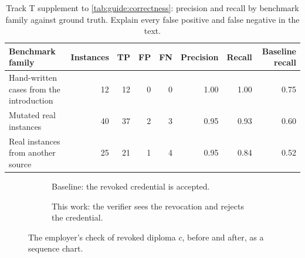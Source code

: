 \begin{table}[!ht]
  \centering
  \caption{Track T supplement to \cref{tab:guide:correctness}: precision and recall by benchmark family against ground truth. Explain every false positive and false negative in the text.}
  \label{tab:guide:precision}
  {\small
  \begin{tabularx}{\linewidth}{>{\raggedright\arraybackslash}X r r r r r r r}
    \toprule
    \textbf{Benchmark family} & \textbf{Instances} & \textbf{TP} & \textbf{FP} & \textbf{FN} & \textbf{Precision} & \textbf{Recall} & \textbf{Baseline recall} \\
    \midrule
    Hand-written cases from the introduction & 12 & 12 & 0 & 0 & 1.00 & 1.00 & 0.75 \\
    Mutated real instances & 40 & 37 & 2 & 3 & 0.95 & 0.93 & 0.60 \\
    Real instances from another source & 25 & 21 & 1 & 4 & 0.95 & 0.84 & 0.52 \\
    \bottomrule
  \end{tabularx}
  }
\end{table}

\begin{figure}[!ht]
  \centering
  \newcommand{\lifelines}{%
    \foreach \x/\n in {0/Issuer, 2.1/Holder, 4.2/Verifier, 6.3/Registry} {%
      \node[role] at (\x, 0) {\n}; \draw[lifeline] (\x, -0.3) -- (\x, -3.4);}%
    \draw[msg] (0, -0.8) -- node[above] {issue $c$} (2.1, -0.8);
    \draw[msg] (0, -1.4) -- node[above, pos=0.82] {revoke $c$} (6.3, -1.4);
    \draw[msg] (2.1, -2.0) -- node[above] {present $c$} (4.2, -2.0);}
  \begin{subfigure}[b]{0.49\linewidth}
    \centering
    \caption{Baseline: the revoked credential is accepted.}\label{fig:guide:example-trace-baseline}
  \end{subfigure}\hfill
  \begin{subfigure}[b]{0.49\linewidth}
    \centering
    \caption{This work: the verifier sees the revocation and rejects the credential.}\label{fig:guide:example-trace-ours}
  \end{subfigure}
  \caption{The employer's check of revoked diploma $c$, before and after, as a sequence chart.}
  \label{fig:guide:example-trace}
\end{figure}

